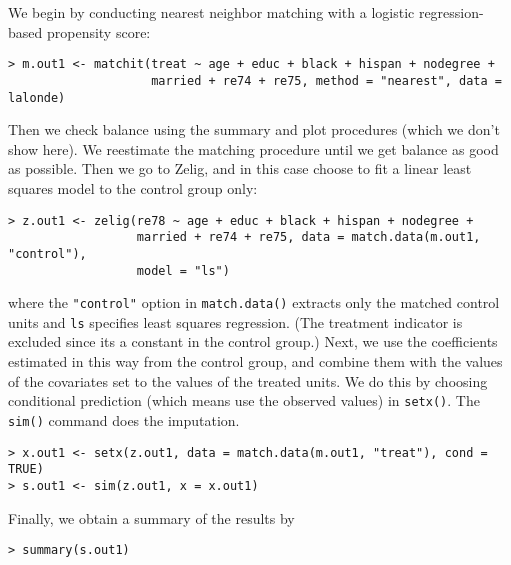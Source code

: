 \begin{description}
  We begin by conducting nearest neighbor matching with a logistic
  regression-based propensity score:
\begin{verbatim}
> m.out1 <- matchit(treat ~ age + educ + black + hispan + nodegree + 
                    married + re74 + re75, method = "nearest", data = lalonde)
\end{verbatim}
  Then we check balance using the summary and plot procedures (which
  we don't show here).  We reestimate the matching procedure until we
  get balance as good as possible.  Then we go to Zelig, and in this
  case choose to fit a linear least squares model to the control group
  only:
\begin{verbatim}
> z.out1 <- zelig(re78 ~ age + educ + black + hispan + nodegree + 
                  married + re74 + re75, data = match.data(m.out1, "control"), 
                  model = "ls")
\end{verbatim}
  where the {\tt "control"} option in {\tt match.data()} extracts only
  the matched control units and {\tt ls} specifies least squares
  regression.  (The treatment indicator is excluded since its a
  constant in the control group.)  Next, we use the coefficients
  estimated in this way from the control group, and combine them with
  the values of the covariates set to the values of the treated units.
  We do this by choosing conditional prediction (which means use the
  observed values) in \texttt{setx()}.  The {\tt sim()} command does
  the imputation.
\begin{verbatim}
> x.out1 <- setx(z.out1, data = match.data(m.out1, "treat"), cond = TRUE)
> s.out1 <- sim(z.out1, x = x.out1)
\end{verbatim}
Finally, we obtain a summary of the results by 
\begin{verbatim}
> summary(s.out1)
\end{verbatim}


\end{description}
